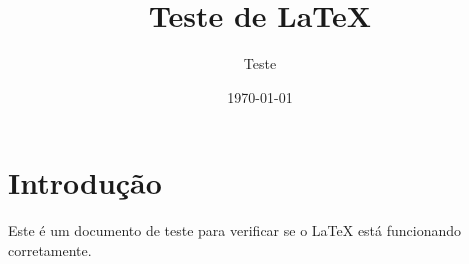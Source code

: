 \documentclass{article}
\title{Teste de LaTeX}
\author{Teste}
\date{\today}
\begin{document}
\maketitle

\section{Introdução}
Este é um documento de teste para verificar se o LaTeX está funcionando corretamente.
\end{document}
